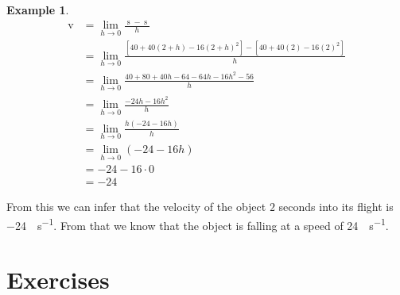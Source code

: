 \documentclass[12pt,]{book}
\theoremstyle{plain}
\theoremstyle{definition}
\newtheorem{example}[theorem]{Example}
\numberwithin{equation}{section}
\newcommand{\fe}[2]{\mathop{{#1}{\left(#2\right)}}}
\begin{document}
\begin{example}\label{example-instantaneous-velocity}
\begin{align*}
\fe{v}{2}&=\lim_{h\to0}\frac{\fe{s}{2+h}-\fe{s}{2}}{h}\\
&=\lim_{h\to0}\frac{\left[40+40\left(2+h\right)-16\left(2+h\right)^2\right]-\left[40+40(2)-16(2)^2\right]}{h}\\
&=\lim_{h\to0}\frac{40+80+40h-64-64h-16h^2-56}{h}\\
&=\lim_{h\to0}\frac{-24h-16h^2}{h}\\
&=\lim_{h\to0}\frac{h\left(-24-16h\right)}{h}\\
&=\lim_{h\to0}\left(-24-16h\right)\\
&=-24-16\cdot0\\
&=-24
\end{align*}%
\par
From this we can infer that the velocity of the object \(2\) seconds into its flight is \SI{-24}{\foot\per\second}. From that we know that the object is falling at a speed of \SI{24}{\foot\per\second}.%
\end{example}
\typeout{************************************************}
\typeout{************************************************}
\section*{Exercises}\label{exercises-17}
\end{document}
